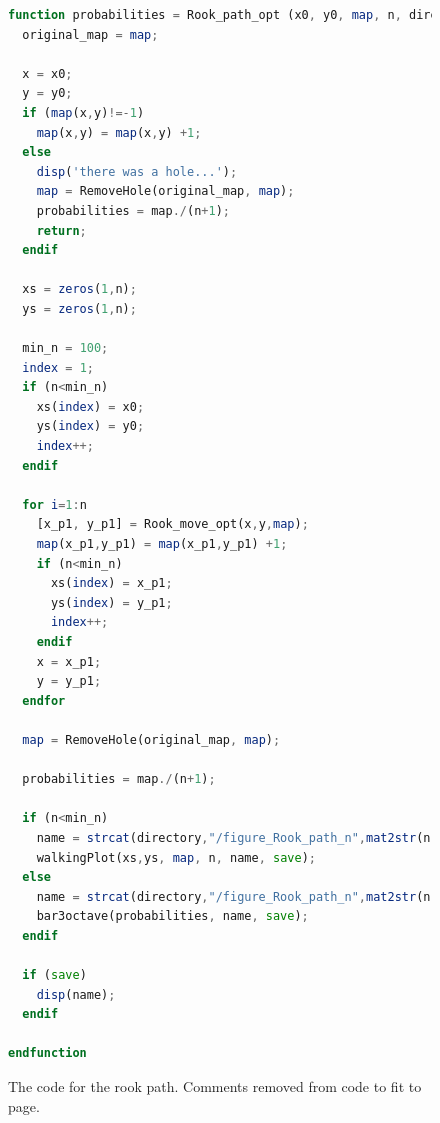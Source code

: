 \documentclass{amsart}
\numberwithin{equation}{section}
\begin{document}
\begin{figure}[!h]
    \centering

\begin{lstlisting}[language=octave]
function probabilities = Rook_path_opt (x0, y0, map, n, directory, save)
  original_map = map;
  
  x = x0;
  y = y0;
  if (map(x,y)!=-1)
    map(x,y) = map(x,y) +1;
  else
    disp('there was a hole...');
    map = RemoveHole(original_map, map);
    probabilities = map./(n+1);
    return;
  endif
  
  xs = zeros(1,n);
  ys = zeros(1,n);
  
  min_n = 100;
  index = 1;
  if (n<min_n)
    xs(index) = x0;
    ys(index) = y0;
    index++;
  endif
  
  for i=1:n
    [x_p1, y_p1] = Rook_move_opt(x,y,map);
    map(x_p1,y_p1) = map(x_p1,y_p1) +1; 
    if (n<min_n) 
      xs(index) = x_p1;
      ys(index) = y_p1;
      index++;
    endif
    x = x_p1;
    y = y_p1;
  endfor
  
  map = RemoveHole(original_map, map);
  
  probabilities = map./(n+1);
  
  if (n<min_n)
    name = strcat(directory,"/figure_Rook_path_n",mat2str(n),"_x",mat2str(x0),"_y",mat2str(y0),".png");
    walkingPlot(xs,ys, map, n, name, save);
  else
    name = strcat(directory,"/figure_Rook_path_n",mat2str(n),".png");
    bar3octave(probabilities, name, save);
  endif
  
  if (save)
    disp(name);
  endif
  
endfunction
\end{lstlisting}

    \caption{The code for the rook path. Comments removed from code to fit to page.}
    \label{code:rook_path}
\end{figure}
\end{document}
